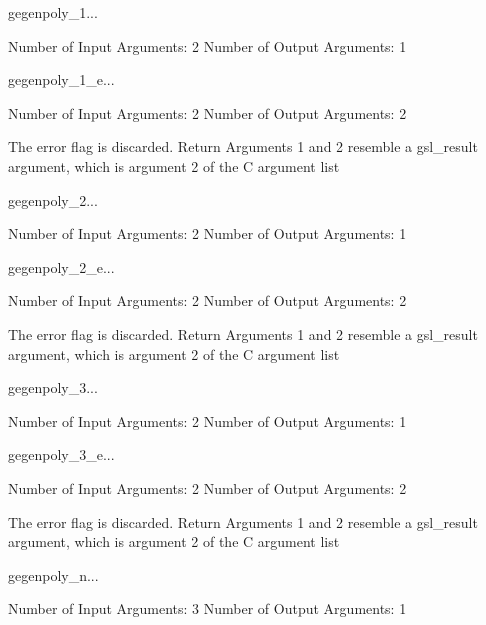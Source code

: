 \begin{funcdesc}{gegenpoly_1}{...}

    Number of Input  Arguments:  2
    Number of Output Arguments:  1
\end{funcdesc}

\begin{funcdesc}{gegenpoly_1_e}{...}

    Number of Input  Arguments:  2
    Number of Output Arguments:  2

The error flag is discarded.
Return Arguments 1 and 2 resemble a gsl_result argument,
	which is  argument 2 of the C argument list

\end{funcdesc}

\begin{funcdesc}{gegenpoly_2}{...}

    Number of Input  Arguments:  2
    Number of Output Arguments:  1
\end{funcdesc}

\begin{funcdesc}{gegenpoly_2_e}{...}

    Number of Input  Arguments:  2
    Number of Output Arguments:  2

The error flag is discarded.
Return Arguments 1 and 2 resemble a gsl_result argument,
	which is  argument 2 of the C argument list

\end{funcdesc}

\begin{funcdesc}{gegenpoly_3}{...}

    Number of Input  Arguments:  2
    Number of Output Arguments:  1
\end{funcdesc}

\begin{funcdesc}{gegenpoly_3_e}{...}

    Number of Input  Arguments:  2
    Number of Output Arguments:  2

The error flag is discarded.
Return Arguments 1 and 2 resemble a gsl_result argument,
	which is  argument 2 of the C argument list

\end{funcdesc}

\begin{funcdesc}{gegenpoly_n}{...}

    Number of Input  Arguments:  3
    Number of Output Arguments:  1
\end{funcdesc}

